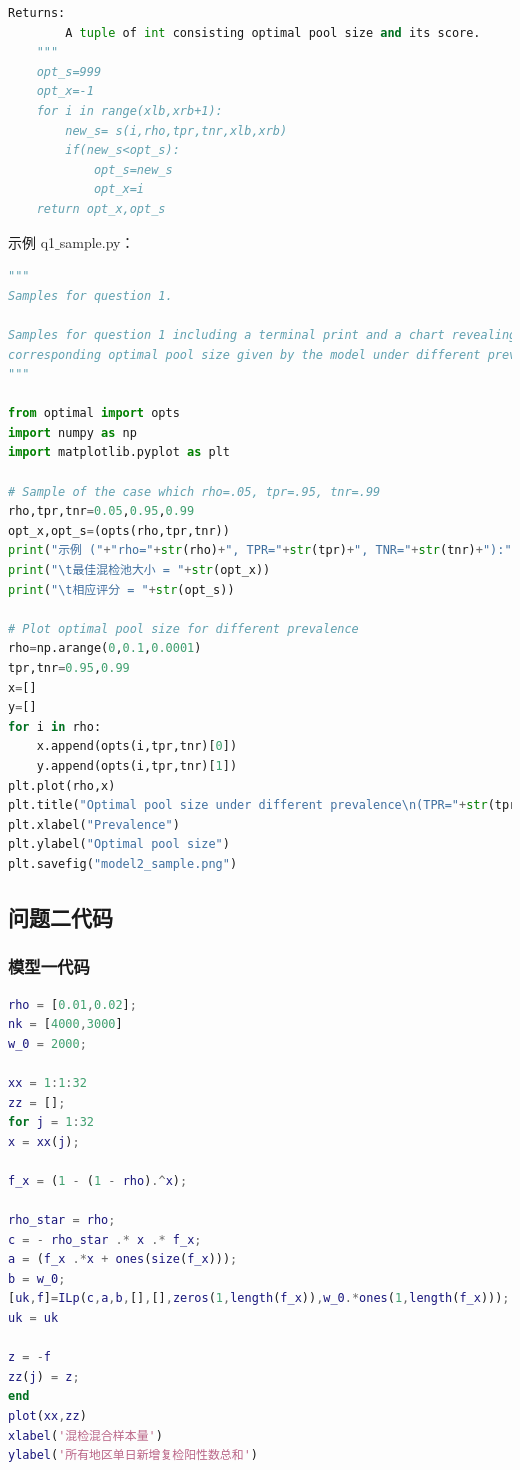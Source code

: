 \documentclass[withoutpreface,bwprint]{cumcmthesis} %
\begin{document}
\begin{appendices}
\begin{lstlisting}[language = python]
    Returns:
        A tuple of int consisting optimal pool size and its score.
    """
    opt_s=999
    opt_x=-1
    for i in range(xlb,xrb+1):
        new_s= s(i,rho,tpr,tnr,xlb,xrb)
        if(new_s<opt_s):
            opt_s=new_s
            opt_x=i
    return opt_x,opt_s

\end{lstlisting}
示例 q1$\_$sample.py：
\begin{lstlisting}[language=python]
"""
Samples for question 1.

Samples for question 1 including a terminal print and a chart revealing the
corresponding optimal pool size given by the model under different prevalence.
"""

from optimal import opts
import numpy as np
import matplotlib.pyplot as plt

# Sample of the case which rho=.05, tpr=.95, tnr=.99
rho,tpr,tnr=0.05,0.95,0.99
opt_x,opt_s=(opts(rho,tpr,tnr))
print("示例 ("+"rho="+str(rho)+", TPR="+str(tpr)+", TNR="+str(tnr)+"):")
print("\t最佳混检池大小 = "+str(opt_x))
print("\t相应评分 = "+str(opt_s))

# Plot optimal pool size for different prevalence
rho=np.arange(0,0.1,0.0001)
tpr,tnr=0.95,0.99
x=[]
y=[]
for i in rho:
    x.append(opts(i,tpr,tnr)[0])
    y.append(opts(i,tpr,tnr)[1])
plt.plot(rho,x)
plt.title("Optimal pool size under different prevalence\n(TPR="+str(tpr)+", TNR="+str(tnr)+")")
plt.xlabel("Prevalence")
plt.ylabel("Optimal pool size")
plt.savefig("model2_sample.png")
\end{lstlisting}
\subsection{问题二代码}
\subsubsection{模型一代码}
\begin{lstlisting}[language = matlab]
rho = [0.01,0.02];
nk = [4000,3000]
w_0 = 2000;

xx = 1:1:32
zz = [];
for j = 1:32
x = xx(j);

f_x = (1 - (1 - rho).^x);

rho_star = rho;
c = - rho_star .* x .* f_x;
a = (f_x .*x + ones(size(f_x)));
b = w_0;
[uk,f]=ILp(c,a,b,[],[],zeros(1,length(f_x)),w_0.*ones(1,length(f_x)));
uk = uk

z = -f
zz(j) = z;
end
plot(xx,zz)
xlabel('混检混合样本量')
ylabel('所有地区单日新增复检阳性数总和')
\end{lstlisting}

\end{appendices}
\end{document}
